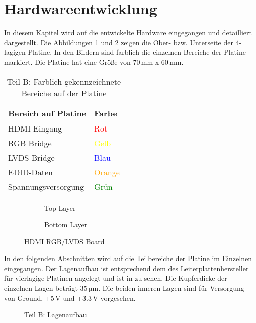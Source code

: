 \section{Hardwareentwicklung}
\label{sec:TeilB_Hardware}
In diesem Kapitel wird auf die entwickelte Hardware eingegangen und detailliert dargestellt. Die Abbildungen \ref{fig:teilb_pcb_top} und \ref{fig:teilb_pcb_bot} zeigen die Ober- bzw. Unterseite der 4-lagigen Platine. In den Bildern sind farblich die einzelnen Bereiche der Platine markiert. Die Platine hat eine Größe von 70\,mm x 60\,mm.

\begin{table}[h]
\begin{tabular}{|p{8cm}|p{5.5cm}|}\hline
\rowcolor{TableBackgroundColor} 
   \textbf{Bereich auf Platine} & \textbf{Farbe}\\ \hline
  HDMI Eingang &  \textcolor{red}{Rot} \\ \hline
  RGB Bridge & \textcolor{yellow}{Gelb} \\ \hline
  LVDS Bridge & \textcolor{blue}{Blau}  \\ \hline
  EDID-Daten &  \textcolor{orange}{Orange} \\ \hline
  Spannungsversorgung &  \textcolor{green}{Grün} \\ \hline 
\end{tabular}
\caption{Teil B: Farblich gekennzeichnete Bereiche auf der Platine}
\label{tab:pcb_areas}
\end{table}

\begin{figure}[htbp]
        \centering
        \begin{subfigure}[htp]{0.48\textwidth}
                \caption{Top Layer}
                \label{fig:teilb_pcb_top}
        \end{subfigure}
\quad 
        \begin{subfigure}[htp]{0.48\textwidth}
                             				\caption{Bottom Layer}
                \label{fig:teilb_pcb_bot}
        \end{subfigure}
        \caption{HDMI RGB/LVDS Board}
        \label{fig:teilb_pcb}
\end{figure}

In den folgenden Abschnitten wird auf die Teilbereiche der Platine im Einzelnen eingegangen. Der Lagenaufbau ist entsprechend dem des Leiterplattenhersteller für vierlagige Platinen angelegt und ist in  zu sehen. Die Kupferdicke der einzelnen Lagen beträgt 35\,µm. Die beiden inneren Lagen sind für Versorgung von Ground, +5\,V und +3.3\,V vorgesehen.
        \begin{figure}[htp]
        	\center
            \caption{Teil B: Lagenaufbau}
            \label{fig:teilb_lagenaufbau}
        \end{figure}

